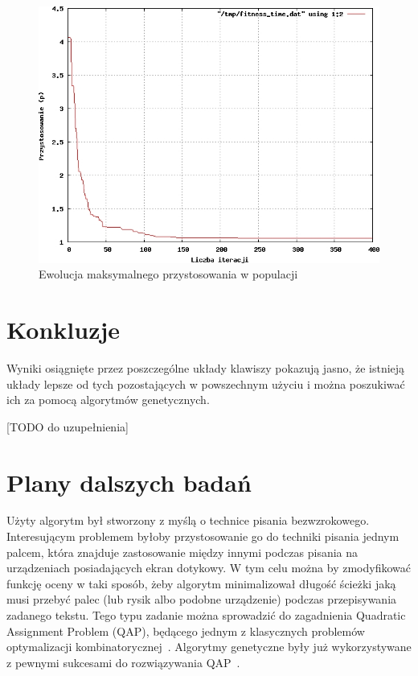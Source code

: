 \documentclass[brudnopis]{xmgr}
\begin{document}
\begin{figure}[!tbh]
\centering
\includegraphics[width=.8\hsize]{fig/fitness_time_pl}
\caption{Ewolucja maksymalnego przystosowania w populacji}
\end{figure}


\summary

\section{Konkluzje}

Wyniki osiągnięte przez poszczególne układy klawiszy pokazują jasno, że istnieją układy lepsze od tych pozostających w powszechnym użyciu i można poszukiwać ich za pomocą algorytmów genetycznych.
\newline

[TODO do uzupełnienia]

\section{Plany dalszych badań}

Użyty algorytm był stworzony z myślą o technice pisania bezwzrokowego. Interesującym problemem byłoby przystosowanie go do techniki pisania jednym palcem, która znajduje zastosowanie między innymi podczas pisania na urządzeniach posiadających ekran dotykowy. W tym celu można by zmodyfikować funkcję oceny w taki sposób, żeby algorytm minimalizował długość ścieżki jaką musi przebyć palec (lub rysik albo podobne urządzenie) podczas przepisywania zadanego tekstu. Tego typu zadanie można sprowadzić do zagadnienia Quadratic Assignment Problem (QAP), będącego jednym z klasycznych problemów optymalizacji kombinatorycznej~\cite{Ji_asolution}. Algorytmy genetyczne były już wykorzystywane z pewnymi sukcesami do rozwiązywania QAP~\cite{Misevicius200465}.
\end{document}
